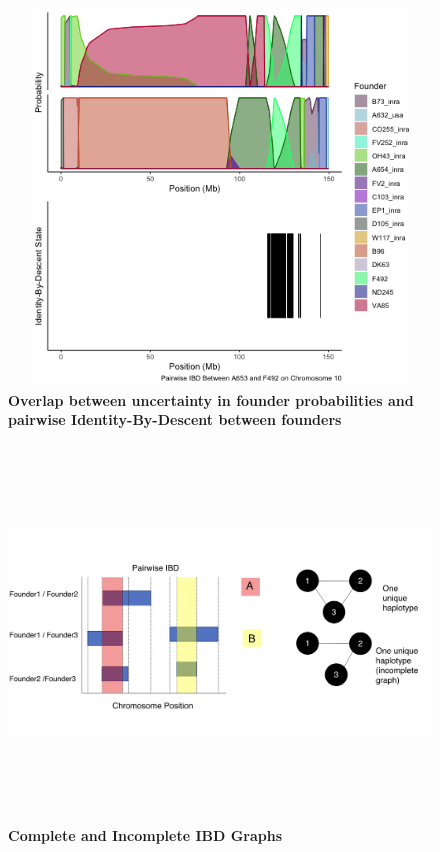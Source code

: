 \documentclass[article,9pt,twocolumn,twoside]{rilabRxiv}
\begin{document}
\begin{figure}[ht]
\centering
\includegraphics[width=16cm,height=10cm]{figures/IBD_supplemental.png}
\caption{\textbf{Overlap between uncertainty in founder probabilities and pairwise Identity-By-Descent between founders}}
\label{fig:supfigure5}
\end{figure}

\begin{figure}[ht]
\centering
    \includegraphics[width=16cm,height=10cm]{figures/IBD_graph_example.png}
\caption{\textbf{Complete and Incomplete IBD Graphs}}
\label{fig:supfigure6}
\end{figure}
\end{document}
